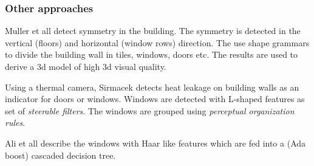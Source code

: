 

\subsubsection{Other approaches}
Muller et all \cite{Muller_procedural} detect symmetry in the building. The
symmetry is detected in the vertical (floors) and horizontal (window
rows) direction.
The use shape grammars to divide the building wall in tiles, windows, doors etc.
The results are used to derive a 3d model of high 3d visual quality.

Using a thermal camera, Sirmacek \cite{Sirmacek_thermal}
detects heat leakage on building walls as an indicator for doors or windows.
Windows are detected with L-shaped features as set of \emph{steerable filters}.
The windows are grouped using \emph{perceptual organization rules}.

Ali et all \cite{Ali_facades}
describe the windows with Haar like features which are fed into a (Ada boost) cascaded decision tree.










